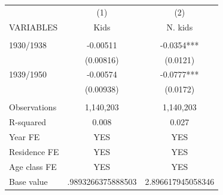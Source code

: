 \begin{tabular}{lcc} \hline
 & (1) & (2) \\
VARIABLES & Kids & N. kids \\ \hline
 &  &  \\
1930/1938 & -0.00511 & -0.0354*** \\
 & (0.00816) & (0.0121) \\
1939/1950 & -0.00574 & -0.0777*** \\
 & (0.00938) & (0.0172) \\
 &  &  \\
Observations & 1,140,203 & 1,140,203 \\
R-squared & 0.008 & 0.027 \\
Year FE & YES & YES \\
Residence FE & YES & YES \\
Age class FE & YES & YES \\
 Base value & .9893266375888503 & 2.896617945058346 \\ \hline
\end{tabular}
